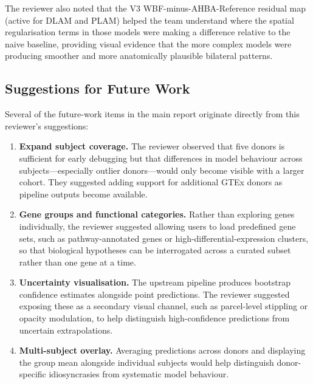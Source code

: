 \documentclass[11pt,letterpaper]{article}
\begin{document}
The reviewer also noted that the V3 WBF-minus-AHBA-Reference residual map
(active for DLAM and PLAM) helped the team understand where the spatial
regularisation terms in those models were making a difference relative to
the naive baseline, providing visual evidence that the more complex models
were producing smoother and more anatomically plausible bilateral patterns.

\subsection*{Suggestions for Future Work}

Several of the future-work items in the main report originate directly from
this reviewer's suggestions:

\begin{enumerate}[nosep]
  \item \textbf{Expand subject coverage.}
        The reviewer observed that five donors is sufficient for early debugging
        but that differences in model behaviour across subjects—especially
        outlier donors—would only become visible with a larger cohort.
        They suggested adding support for additional GTEx donors as pipeline
        outputs become available.

  \item \textbf{Gene groups and functional categories.}
        Rather than exploring genes individually, the reviewer suggested
        allowing users to load predefined gene sets, such as pathway-annotated
        genes or high-differential-expression clusters, so that biological
        hypotheses can be interrogated across a curated subset rather than one
        gene at a time.

  \item \textbf{Uncertainty visualisation.}
        The upstream pipeline produces bootstrap confidence estimates alongside
        point predictions.
        The reviewer suggested exposing these as a secondary visual channel,
        such as parcel-level stippling or opacity modulation, to help
        distinguish high-confidence predictions from uncertain extrapolations.

  \item \textbf{Multi-subject overlay.}
        Averaging predictions across donors and displaying the group mean
        alongside individual subjects would help distinguish donor-specific
        idiosyncrasies from systematic model behaviour.
\end{enumerate}
\end{document}
